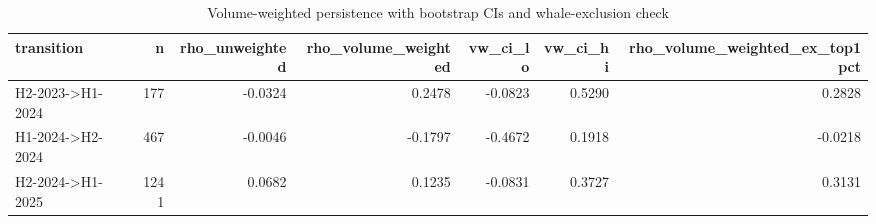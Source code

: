 \begin{table}
\caption{Volume-weighted persistence with bootstrap CIs and whale-exclusion check}
\label{tab:vw_persistence}
\begin{tabular}{lrrrrrr}
\toprule
transition & n & rho_unweighted & rho_volume_weighted & vw_ci_lo & vw_ci_hi & rho_volume_weighted_ex_top1pct \\
\midrule
H2-2023->H1-2024 & 177 & -0.0324 & 0.2478 & -0.0823 & 0.5290 & 0.2828 \\
H1-2024->H2-2024 & 467 & -0.0046 & -0.1797 & -0.4672 & 0.1918 & -0.0218 \\
H2-2024->H1-2025 & 1241 & 0.0682 & 0.1235 & -0.0831 & 0.3727 & 0.3131 \\
\bottomrule
\end{tabular}
\end{table}
